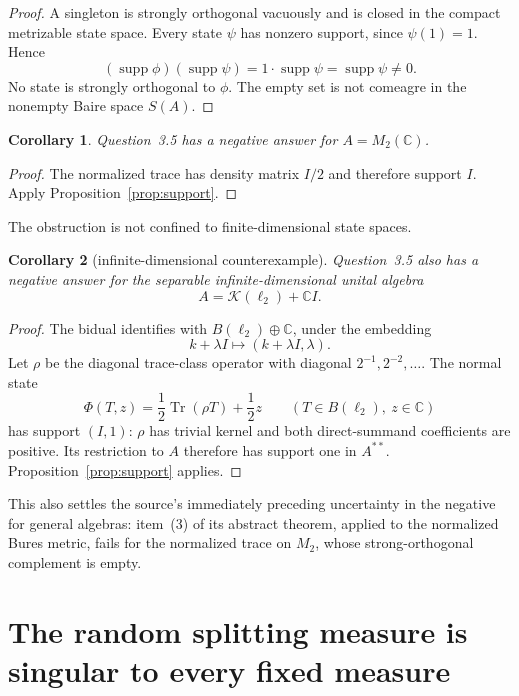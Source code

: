 \documentclass[11pt]{article}
\newtheorem{corollary}{Corollary}
\newcommand{\supp}{\operatorname{supp}}
\newcommand{\K}{\mathcal K}
\begin{document}
\begin{proof}
A singleton is strongly orthogonal vacuously and is closed in the compact
metrizable state space.  Every state $\psi$ has nonzero support, since
$\psi(1)=1$.  Hence
\[
             (\supp\phi)(\supp\psi)=1\cdot\supp\psi
             =\supp\psi\ne0.
\]
No state is strongly orthogonal to $\phi$.  The empty set is not comeagre in
the nonempty Baire space $S(A)$.
\end{proof}

\begin{corollary}\label{cor:m2}
Question~3.5 has a negative answer for $A=M_2(\mathbb C)$.
\end{corollary}

\begin{proof}
The normalized trace has density matrix $I/2$ and therefore support $I$.
Apply Proposition~\ref{prop:support}.
\end{proof}

The obstruction is not confined to finite-dimensional state spaces.

\begin{corollary}[infinite-dimensional counterexample]\label{cor:unitizedK}
Question~3.5 also has a negative answer for the separable infinite-dimensional
unital algebra
\[
                    A=\K(\ell_2)+\mathbb C I.
\]
\end{corollary}

\begin{proof}
The bidual identifies with $B(\ell_2)\oplus\mathbb C$, under the embedding
\[
       k+\lambda I\longmapsto(k+\lambda I,\lambda).
\]
Let $\rho$ be the diagonal trace-class operator with diagonal
$2^{-1},2^{-2},\ldots$.  The normal state
\[
       \Phi(T,z)=\frac12\operatorname{Tr}(\rho T)+\frac12 z
       \qquad(T\in B(\ell_2),\ z\in\mathbb C)
\]
has support $(I,1)$: $\rho$ has trivial kernel and both direct-summand
coefficients are positive.  Its restriction to $A$ therefore has support one
in $A^{**}$.  Proposition~\ref{prop:support} applies.
\end{proof}

This also settles the source's immediately preceding uncertainty in the
negative for general algebras: item~(3) of its abstract theorem, applied to
the normalized Bures metric, fails for the normalized trace on $M_2$, whose
strong-orthogonal complement is empty.

\section{The random splitting measure is singular to every fixed measure}
\end{document}
